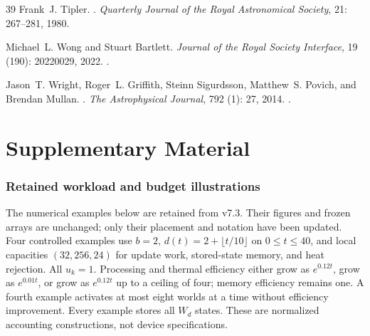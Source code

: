 \documentclass[11pt,a4paper]{article}
\theoremstyle{definition}\newtheorem{definition}{Definition}
\begin{document}
\begin{thebibliography}{39}
Frank~J. Tipler.
.
\newblock \emph{Quarterly Journal of the Royal Astronomical Society},
  21: 267--281, 1980.

Michael~L. Wong and Stuart Bartlett.
\newblock \emph{Journal of the Royal Society Interface}, 19
  (190): 20220029, 2022.
\newblock {}.

Jason~T. Wright, Roger~L. Griffith, Steinn Sigurdsson, Matthew~S. Povich, and
  Brendan Mullan.
.
\newblock \emph{The Astrophysical Journal}, 792 (1): 27,
  2014.
\newblock {}.


\end{thebibliography}
\clearpage
{}
\label{page:supplement-start}
\part*{Supplementary Material}
\suppressfloats[t]
\setcounter{section}{0}
\renewcommand{\thesection}{S\arabic{section}}
\renewcommand{\theHsection}{supp.\arabic{section}}
\renewcommand{\theHfigure}{supp.\arabic{figure}}
\renewcommand{\theHtable}{supp.\arabic{table}}
\setcounter{figure}{0}
\setcounter{table}{0}
\section{Retained workload and budget illustrations}
\label{supp:workload}
The numerical examples below are retained from v7.3. Their figures and frozen
arrays are unchanged; only their placement and notation have been updated.
Four controlled examples use $b=2$, $d(t)=2+\lfloor t/10\rfloor$ on $0\leq t\leq40$, and local capacities $(32,256,24)$ for update work, stored-state memory, and heat rejection. All $u_k=1$. Processing and thermal efficiency either grow as $e^{0.12t}$, grow as $e^{0.01t}$, or grow as $e^{0.12t}$ up to a ceiling of four; memory efficiency remains one. A fourth example activates at most eight worlds at a time without efficiency improvement. Every example stores all $W_d$ states. These are normalized accounting constructions, not device specifications.
\end{document}

